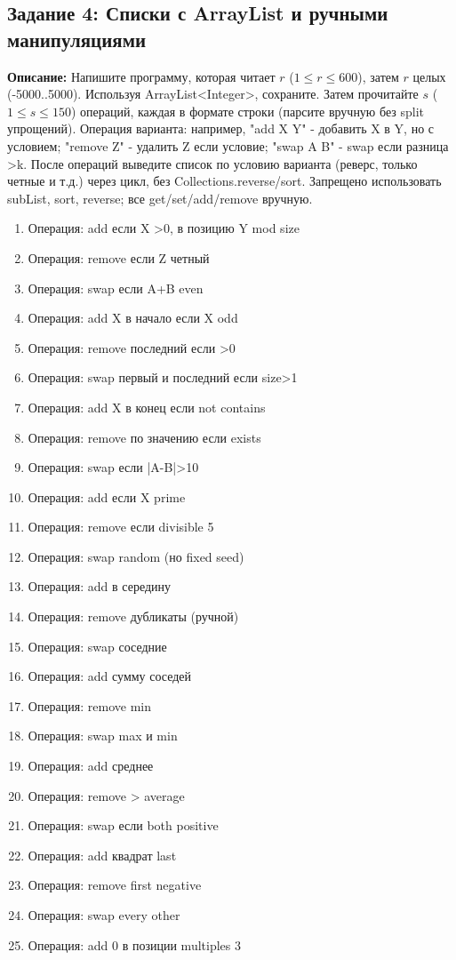 \documentclass[12pt]{article}
\begin{document}
\subsection{Задание 4: Списки с ArrayList и ручными манипуляциями}
  \textbf{Описание:} Напишите программу, которая читает $r$ ($1 \leq r \leq 600$), затем $r$ целых (-5000..5000). Используя ArrayList<Integer>, сохраните. Затем прочитайте $s$ ($1 \leq s \leq 150$) операций, каждая в формате строки (парсите вручную без split упрощений). Операция варианта: например, "add X Y" - добавить X в Y, но с условием; "remove Z" - удалить Z если условие; "swap A B" - swap если разница >k. После операций выведите список по условию варианта (реверс, только четные и т.д.) через цикл, без Collections.reverse/sort. Запрещено использовать subList, sort, reverse; все get/set/add/remove вручную.

  \begin{enumerate}
    \item Операция: add если X >0, в позицию Y mod size
    \item Операция: remove если Z четный
    \item Операция: swap если A+B even
    \item Операция: add X в начало если X odd
    \item Операция: remove последний если >0
    \item Операция: swap первый и последний если size>1
    \item Операция: add X в конец если not contains
    \item Операция: remove по значению если exists
    \item Операция: swap если |A-B|>10
    \item Операция: add если X prime
    \item Операция: remove если divisible 5
    \item Операция: swap random (но fixed seed)
    \item Операция: add в середину
    \item Операция: remove дубликаты (ручной)
    \item Операция: swap соседние
    \item Операция: add сумму соседей
    \item Операция: remove min
    \item Операция: swap max и min
    \item Операция: add среднее
    \item Операция: remove > average
    \item Операция: swap если both positive
    \item Операция: add квадрат last
    \item Операция: remove first negative
    \item Операция: swap every other
    \item Операция: add 0 в позиции multiples 3
  \end{enumerate}
\end{document}
